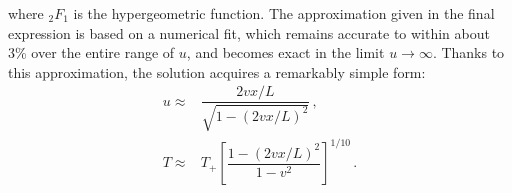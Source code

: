 \documentclass[a4paper, amsfonts, amssymb, amsmath, reprint, showkeys, nofootinbib, twoside,notitlepage,onecolumn]{revtex4-1}
\theoremstyle{definition}
\theoremstyle{theorem}
\begin{document}
where $_2 F_1$ is the hypergeometric function. The approximation given in the final expression is based on a numerical fit, which remains accurate to within about 3\% over the entire range of $u$, and becomes exact in the limit $u \to \infty$. Thanks to this approximation, the solution acquires a remarkably simple form:
\begin{equation}
\begin{split}
u\approx{}& \dfrac{2vx/L}{\sqrt{1-(2vx/L)^2}}\, ,\\
T\approx{}& T_+ \left[ \dfrac{1-(2vx/L)^2}{1-v^2}\right]^{1/10}\, .\\
\end{split}
\end{equation}





\label{lastpage}
\end{document}
